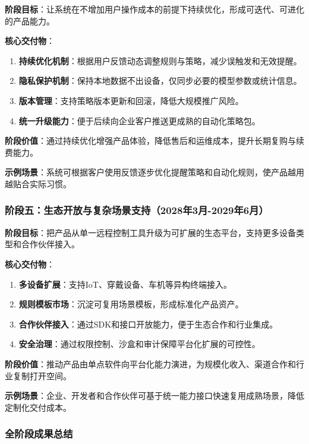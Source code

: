 \documentclass[12pt,a4paper]{article}
\begin{document}
\textbf{阶段目标}：让系统在不增加用户操作成本的前提下持续优化，形成可迭代、可进化的产品能力。

\textbf{核心交付物}：

\begin{enumerate}
  \item \textbf{持续优化机制}：根据用户反馈动态调整规则与策略，减少误触发和无效提醒。
  \item \textbf{隐私保护机制}：保持本地数据不出设备，仅同步必要的模型参数或统计信息。
  \item \textbf{版本管理}：支持策略版本更新和回滚，降低大规模推广风险。
  \item \textbf{统一升级能力}：便于后续向企业客户推送更成熟的自动化策略包。
\end{enumerate}

\textbf{阶段价值}：通过持续优化增强产品体验，降低售后和运维成本，提升长期复购与续费能力。

\textbf{示例场景}：系统可根据客户使用反馈逐步优化提醒策略和自动化规则，使产品越用越贴合实际习惯。

\subsubsection{阶段五：生态开放与复杂场景支持（2028年3月-2029年6月）}

\textbf{阶段目标}：把产品从单一远程控制工具升级为可扩展的生态平台，支持更多设备类型和合作伙伴接入。

\textbf{核心交付物}：

\begin{enumerate}
  \item \textbf{多设备扩展}：支持IoT、穿戴设备、车机等异构终端接入。
  \item \textbf{规则模板市场}：沉淀可复用场景模板，形成标准化产品资产。
  \item \textbf{合作伙伴接入}：通过SDK和接口开放能力，便于生态合作和行业集成。
  \item \textbf{安全治理}：通过权限控制、沙盒和审计保障平台化扩展的可控性。
\end{enumerate}

\textbf{阶段价值}：推动产品由单点软件向平台化能力演进，为规模化收入、渠道合作和行业复制打开空间。

\textbf{示例场景}：企业、开发者和合作伙伴可基于统一能力接口快速复用成熟场景，降低定制化交付成本。

\subsubsection{全阶段成果总结}
\end{document}
